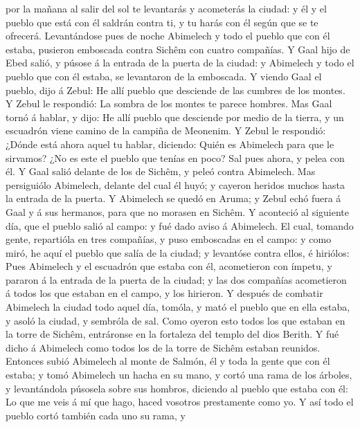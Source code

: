 por la mañana al salir del sol te levantarás y acometerás la ciudad: y
él y el pueblo que está con él saldrán contra ti, y tu harás con él
según que se te ofrecerá.  Levantándose pues de noche
Abimelech y todo el pueblo que con él estaba, pusieron emboscada contra
Sichêm con cuatro compañías.  Y Gaal hijo de Ebed salió, y
púsose á la entrada de la puerta de la ciudad: y Abimelech y todo el
pueblo que con él estaba, se levantaron de la emboscada.  Y
viendo Gaal el pueblo, dijo á Zebul: He allí pueblo que desciende de las
cumbres de los montes. Y Zebul le respondió: La sombra de los montes te
parece hombres.  Mas Gaal tornó á hablar, y dijo: He allí
pueblo que desciende por medio de la tierra, y un escuadrón viene camino
de la campiña de Meonenim.  Y Zebul le respondió: ¿Dónde
está ahora aquel tu hablar, diciendo: Quién es Abimelech para que le
sirvamos? ¿No es este el pueblo que tenías en poco? Sal pues ahora, y
pelea con él.  Y Gaal salió delante de los de Sichêm, y
peleó contra Abimelech.  Mas persiguiólo Abimelech, delante
del cual él huyó; y cayeron heridos muchos hasta la entrada de la
puerta.  Y Abimelech se quedó en Aruma; y Zebul echó fuera
á Gaal y á sus hermanos, para que no morasen en Sichêm.  Y
aconteció al siguiente día, que el pueblo salió al campo: y fué dado
aviso á Abimelech.  El cual, tomando gente, repartióla en
tres compañías, y puso emboscadas en el campo: y como miró, he aquí el
pueblo que salía de la ciudad; y levantóse contra ellos, é hiriólos:
 Pues Abimelech y el escuadrón que estaba con él,
acometieron con ímpetu, y pararon á la entrada de la puerta de la
ciudad; y las dos compañías acometieron á todos los que estaban en el
campo, y los hirieron.  Y después de combatir Abimelech la
ciudad todo aquel día, tomóla, y mató el pueblo que en ella estaba, y
asoló la ciudad, y sembróla de sal.  Como oyeron esto todos
los que estaban en la torre de Sichêm, entráronse en la fortaleza del
templo del dios Berith.  Y fué dicho á Abimelech como todos
los de la torre de Sichêm estaban reunidos.  Entonces subió
Abimelech al monte de Salmón, él y toda la gente que con él estaba; y
tomó Abimelech un hacha en su mano, y cortó una rama de los árboles, y
levantándola púsosela sobre sus hombros, diciendo al pueblo que estaba
con él: Lo que me veis á mí que hago, haced vosotros prestamente como
yo.  Y así todo el pueblo cortó también cada uno su rama, y
